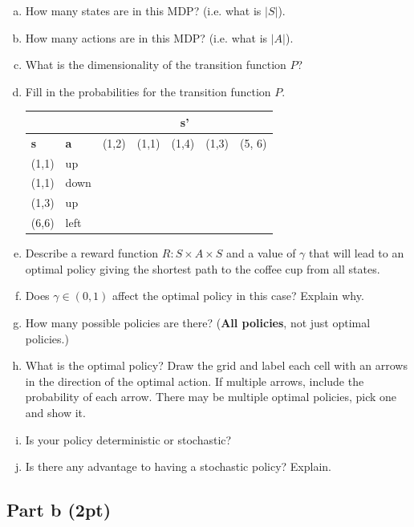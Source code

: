 \documentclass[12pt]{article}
\begin{document}
\begin{enumerate}[a)]
\item  How many states are in this MDP? (i.e. what is $|S|$).
\item How many actions are in this MDP? (i.e. what is $|A|$).
\item What is the dimensionality of the transition function $P$?
\item Fill in the probabilities for the transition function $P$.\\
  \begin{center}
    \begin{tabular}{|l|l|c|c|c|c|c|}\hline
      \multicolumn{2}{|c|}{} &
                               \multicolumn{5}{|c|}{\textbf{s'}}\\\hline
      \textbf{s} & \textbf{a} & (1,2) & (1,1) & (1,4) & (1,3) & (5, 6)\\\hline
      (1,1) & up & & & & &\\ \hline
      (1,1) & down & & & & &\\ \hline
      (1,3) & up & & & & &\\ \hline
      (6,6) & left & & & & &\\ \hline
    \end{tabular}
  \end{center}

\item Describe a reward function $R : S \times A \times S$ 
  and a value of $\gamma$ that
  will lead to an optimal policy giving the shortest path to the coffee cup from
  all states.
\item Does $\gamma \in (0, 1)$ affect the optimal policy in this case?
  Explain why.
\item How many possible policies are there?  (\textbf{All policies},
  not just optimal policies.)
\item What is the optimal policy? Draw the grid and label each cell
  with an arrows in the direction of the optimal action. If multiple
  arrows, include the probability of each arrow. There may be
  multiple optimal policies, pick one and show it.
\item Is your policy deterministic or stochastic?
\item Is there any advantage to having a stochastic policy? Explain.
\end{enumerate}

\subsection*{Part b (2pt)}
\end{document}
